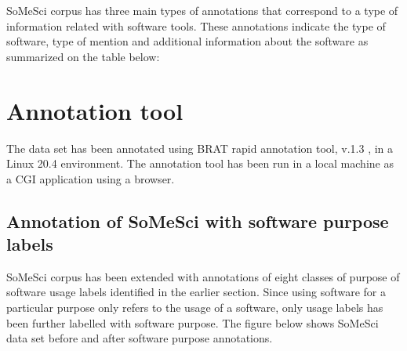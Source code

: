 SoMeSci corpus has three main types of annotations that correspond to a type of information related with software tools. These annotations indicate the type of software, type of mention and additional information about the software as summarized on the table below:


\section{Annotation tool}
\label{sec:dataset:tool}
The data set has been annotated using BRAT rapid annotation tool, v.1.3 , in a Linux 20.4 environment. The annotation tool has been run in a local machine as a CGI application using a browser. 

\subsection{Annotation of SoMeSci with software purpose labels}
\label{subsec:dataset:tool:Annotationprocess}

SoMeSci corpus has been extended with annotations of eight classes of purpose of software usage labels identified in the earlier section. Since using software for a particular purpose only refers to the usage of a software, only usage labels has been further labelled with software purpose. The figure below shows SoMeSci data set before and after software purpose annotations. 

